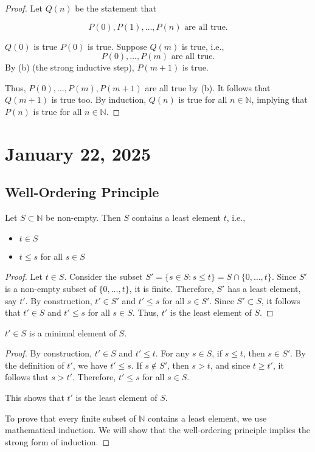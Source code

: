 \documentclass[11pt]{article}
\begin{document}
\begin{proof} Let $Q(n)$ be the statement that

    \[
        P(0), P(1), \ldots, P(n) \text{ are all true.}
    \]

    $Q(0)$ is true $P(0)$ is true.
    Suppose $Q(m)$ is true, i.e.,
    \[
        P(0), \ldots, P(m) \text{ are all true.}
    \]
    By (b) (the strong inductive step), $P(m+1)$ is true.

    Thus, $P(0), \ldots, P(m), P(m+1)$ are all true by (b). It follows that
    $Q(m+1)$ is true too. By induction, $Q(n)$ is true for all $n \in \mathbb{N}$,
    implying that $P(n)$ is true for all $n \in \mathbb{N}$.
\end{proof}

\section{January 22, 2025}
\subsection{Well-Ordering Principle}
\begin{theorem} 
    Let $S \subset \mathbb{N}$ be non-empty. Then $S$ contains a least element $t$, i.e.,
    \begin{itemize}
        \item $t \in S$
        \item $t \leq s$ for all $s \in S$
    \end{itemize}
\end{theorem}

\begin{proof}
    Let $t \in S$. Consider the subset $S' = \{ s \in S : s \leq t \} = S \cap \{0, \ldots, t\}$. Since $S'$ is a non-empty subset of $\{0, \ldots, t\}$, it is finite. Therefore, $S'$ has a least element, say $t'$. By construction, $t' \in S'$ and $t' \leq s$ for all $s \in S'$. Since $S' \subset S$, it follows that $t' \in S$ and $t' \leq s$ for all $s \in S$. Thus, $t'$ is the least element of $S$.
\end{proof}
\begin{corollary}
    $t' \in S$ is a minimal element of $S$.
\end{corollary}

\begin{proof}
    By construction, $t' \in S$ and $t' \leq t$. For any $s \in S$, if $s \leq t$, then $s \in S'$. By the definition of $t'$, we have $t' \leq s$. If $s \notin S'$, then $s > t$, and since $t \geq t'$, it follows that $s > t'$. Therefore, $t' \leq s$ for all $s \in S$.

    This shows that $t'$ is the least element of $S$.

    To prove that every finite subset of $\mathbb{N}$ contains a least element, we
    use mathematical induction. We will show that the well-ordering principle
    implies the strong form of induction.
\end{proof}
\end{document}
